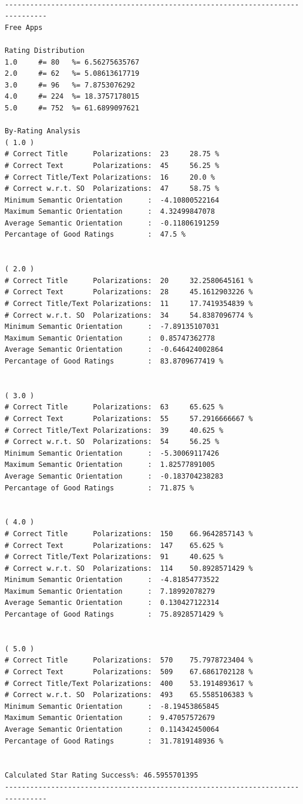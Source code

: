 \documentclass[11pt]{report} %
\begin{document}
\begin{verbatim}

--------------------------------------------------------------------------------
Free Apps

Rating Distribution
1.0 	#= 80 	%= 6.56275635767
2.0 	#= 62 	%= 5.08613617719
3.0 	#= 96 	%= 7.8753076292
4.0 	#= 224 	%= 18.3757178015
5.0 	#= 752 	%= 61.6899097621

By-Rating Analysis
( 1.0 )
# Correct Title      Polarizations:  23 	28.75 %
# Correct Text       Polarizations:  45 	56.25 %
# Correct Title/Text Polarizations:  16 	20.0 %
# Correct w.r.t. SO  Polarizations:  47 	58.75 %
Minimum Semantic Orientation      :  -4.10800522164
Maximum Semantic Orientation      :  4.32499847078
Average Semantic Orientation      :  -0.11806191259
Percantage of Good Ratings        :  47.5 %


( 2.0 )
# Correct Title      Polarizations:  20 	32.2580645161 %
# Correct Text       Polarizations:  28 	45.1612903226 %
# Correct Title/Text Polarizations:  11 	17.7419354839 %
# Correct w.r.t. SO  Polarizations:  34 	54.8387096774 %
Minimum Semantic Orientation      :  -7.89135107031
Maximum Semantic Orientation      :  0.85747362778
Average Semantic Orientation      :  -0.646424002864
Percantage of Good Ratings        :  83.8709677419 %


( 3.0 )
# Correct Title      Polarizations:  63 	65.625 %
# Correct Text       Polarizations:  55 	57.2916666667 %
# Correct Title/Text Polarizations:  39 	40.625 %
# Correct w.r.t. SO  Polarizations:  54 	56.25 %
Minimum Semantic Orientation      :  -5.30069117426
Maximum Semantic Orientation      :  1.82577891005
Average Semantic Orientation      :  -0.183704238283
Percantage of Good Ratings        :  71.875 %


( 4.0 )
# Correct Title      Polarizations:  150 	66.9642857143 %
# Correct Text       Polarizations:  147 	65.625 %
# Correct Title/Text Polarizations:  91 	40.625 %
# Correct w.r.t. SO  Polarizations:  114 	50.8928571429 %
Minimum Semantic Orientation      :  -4.81854773522
Maximum Semantic Orientation      :  7.18992078279
Average Semantic Orientation      :  0.130427122314
Percantage of Good Ratings        :  75.8928571429 %


( 5.0 )
# Correct Title      Polarizations:  570 	75.7978723404 %
# Correct Text       Polarizations:  509 	67.6861702128 %
# Correct Title/Text Polarizations:  400 	53.1914893617 %
# Correct w.r.t. SO  Polarizations:  493 	65.5585106383 %
Minimum Semantic Orientation      :  -8.19453865845
Maximum Semantic Orientation      :  9.47057572679
Average Semantic Orientation      :  0.114342450064
Percantage of Good Ratings        :  31.7819148936 %


Calculated Star Rating Success%: 46.5955701395
--------------------------------------------------------------------------------

\end{verbatim}
\end{document}

